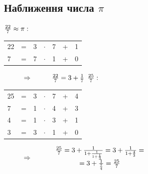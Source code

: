 \documentclass[a4paper,12pt, centered]{bookest}
\newcommand\tab[1][1cm]{\hspace*{#1}}
\begin{document}
\begin{appendices}
\section{Наближення числа $\pi$}
$\frac{22}7\approx\pi:\tab $
\begin{tabular}{ll|l|llll}
\cline{3-3}
22 & = & 3 & $\cdot$ & 7 & + & 1 \\
7  & = & 7 & $\cdot$ & 1 & + & 0 \\ \cline{3-3}
\end{tabular}$\tab\Rightarrow\tab \frac{22}7=3+\frac17\\\\$
$\frac{25}7:\tab $
\begin{tabular}{ll|l|llll}
\cline{3-3}
25 & = & 3 & $\cdot$ & 7 & + & 4 \\
7  & = & 1 & $\cdot$ & 4 & + & 3 \\
4  & = & 1 & $\cdot$ & 3 & + & 1 \\
3  & = & 3 & $\cdot$ & 1 & + & 0 \\ \cline{3-3}
\end{tabular}$\tab\Rightarrow\tab\begin{array}{c}
	\frac {25}7=3+\frac1{1+\frac1{1+\frac13}}=3+\frac1{1+\frac43}=\\=3+\frac1{\frac74}=\frac{25}7
\end{array}$








\end{appendices}
\end{document}
